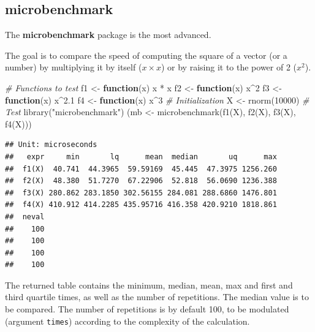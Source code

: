 \documentclass[
  12pt,
  american,
  a4paper,
  extrafontsizes,onecolumn,openright
  ]{memoir}
\newenvironment{Shaded}{\begin{snugshade}}{\end{snugshade}}
\newcommand{\CommentTok}[1]{\textcolor[rgb]{0.56,0.35,0.01}{\textit{#1}}}
\newcommand{\ControlFlowTok}[1]{\textcolor[rgb]{0.13,0.29,0.53}{\textbf{#1}}}
\newcommand{\DecValTok}[1]{\textcolor[rgb]{0.00,0.00,0.81}{#1}}
\newcommand{\FloatTok}[1]{\textcolor[rgb]{0.00,0.00,0.81}{#1}}
\newcommand{\FunctionTok}[1]{\textcolor[rgb]{0.00,0.00,0.00}{#1}}
\newcommand{\NormalTok}[1]{#1}
\newcommand{\OtherTok}[1]{\textcolor[rgb]{0.56,0.35,0.01}{#1}}
\newcommand{\SpecialCharTok}[1]{\textcolor[rgb]{0.00,0.00,0.00}{#1}}
\newcommand{\StringTok}[1]{\textcolor[rgb]{0.31,0.60,0.02}{#1}}
\begin{document}
\normalsize

\hypertarget{microbenchmark}{%
\subsection{microbenchmark}\label{microbenchmark}}

The \textbf{microbenchmark} package is the most advanced.

The goal is to compare the speed of computing the square of a vector (or a number) by multiplying it by itself (\(x \times x\)) or by raising it to the power of 2 (\(x^2\)).

\scriptsize

\begin{Shaded}
\begin{Highlighting}[]
\CommentTok{\# Functions to test}
\NormalTok{f1 }\OtherTok{\textless{}{-}} \ControlFlowTok{function}\NormalTok{(x) x }\SpecialCharTok{*}\NormalTok{ x}
\NormalTok{f2 }\OtherTok{\textless{}{-}} \ControlFlowTok{function}\NormalTok{(x) x}\SpecialCharTok{\^{}}\DecValTok{2}
\NormalTok{f3 }\OtherTok{\textless{}{-}} \ControlFlowTok{function}\NormalTok{(x) x}\SpecialCharTok{\^{}}\FloatTok{2.1}
\NormalTok{f4 }\OtherTok{\textless{}{-}} \ControlFlowTok{function}\NormalTok{(x) x}\SpecialCharTok{\^{}}\DecValTok{3}
\CommentTok{\# Initialization}
\NormalTok{X }\OtherTok{\textless{}{-}} \FunctionTok{rnorm}\NormalTok{(}\DecValTok{10000}\NormalTok{)}
\CommentTok{\# Test}
\FunctionTok{library}\NormalTok{(}\StringTok{"microbenchmark"}\NormalTok{)}
\NormalTok{(mb }\OtherTok{\textless{}{-}} \FunctionTok{microbenchmark}\NormalTok{(}\FunctionTok{f1}\NormalTok{(X), }\FunctionTok{f2}\NormalTok{(X), }\FunctionTok{f3}\NormalTok{(X), }\FunctionTok{f4}\NormalTok{(X)))}
\end{Highlighting}
\end{Shaded}

\begin{verbatim}
## Unit: microseconds
##   expr     min       lq      mean  median       uq      max
##  f1(X)  40.741  44.3965  59.59169  45.445  47.3975 1256.260
##  f2(X)  48.380  51.7270  67.22906  52.818  56.0690 1236.388
##  f3(X) 280.862 283.1850 302.56155 284.081 288.6860 1476.801
##  f4(X) 410.912 414.2285 435.95716 416.358 420.9210 1818.861
##  neval
##    100
##    100
##    100
##    100
\end{verbatim}

\normalsize

The returned table contains the minimum, median, mean, max and first and third quartile times, as well as the number of repetitions.
The median value is to be compared.
The number of repetitions is by default 100, to be modulated (argument \texttt{times}) according to the complexity of the calculation.
\end{document}
